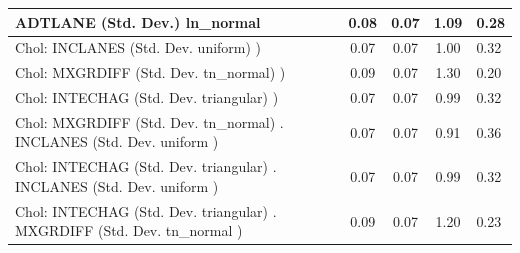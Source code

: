 \begin{table}
\begin{center}
\begin{tabular}{|l|l|c|c|c|l|}
			\hline
			ADTLANE (Std. Dev.) ln_normal &  & 0.08 & 0.07 & 1.09 & 0.28 \\
			\hline
			 Chol: INCLANES (Std. Dev. uniform) ) &  & 0.07 & 0.07 & 1.00 & 0.32 \\
			\hline
			 Chol: MXGRDIFF (Std. Dev. tn_normal) ) &  & 0.09 & 0.07 & 1.30 & 0.20 \\
			\hline
			 Chol: INTECHAG (Std. Dev. triangular) ) &  & 0.07 & 0.07 & 0.99 & 0.32 \\
			\hline
			 Chol: MXGRDIFF (Std. Dev. tn_normal) . INCLANES (Std. Dev.   uniform ) &  & 0.07 & 0.07 & 0.91 & 0.36 \\
			\hline
			 Chol: INTECHAG (Std. Dev. triangular) . INCLANES (Std. Dev.   uniform ) &  & 0.07 & 0.07 & 0.99 & 0.32 \\
			\hline
			 Chol: INTECHAG (Std. Dev. triangular) . MXGRDIFF (Std. Dev.   tn_normal ) &  & 0.09 & 0.07 & 1.20 & 0.23 \\
			\hline
		\end{tabular}
	\end{center}
\end{table}